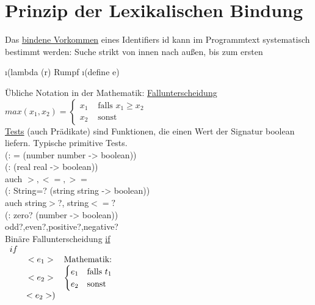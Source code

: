\section*{Prinzip der Lexikalischen Bindung}
Das \underline{bindene Vorkommen} eines Identifiers id kann im Programmtext systematisch bestimmt werden: Suche strikt von innen nach au\ss en, bis zum ersten
\begin{enumerate}[(1)]
\i (lambda (r) \auf Rumpf\zu
\i (define \auf e\zu)
\end{enumerate}
\"Ubliche Notation in der Mathematik: \underline{Fallunterscheidung}\\
$max(x_1,x_2) =
\begin{cases}
x_1 &\text{ falls } x_1 \geq x_2\\
x_2 &\text{ sonst } 
\end{cases}$\\
\underline{Tests} (auch Pr\"adikate) sind Funktionen, die einen Wert der Signatur boolean liefern. Typische primitive Tests.\\
(: = (number number -> boolean))\\
(: \auf (real real -> boolean))\\
auch $>,<=,>=$\\
(: String=? (string string -> boolean))\\
auch string$>$?, string$<=?$\\
(: zero? (number -> boolean))\\
odd?,even?,positive?,negative?\\
Bin\"are Fallunterscheidung \underline{if}\\
$\begin{array}{lcl}
if\\
& <e_1>& \text{Mathematik:}\\
& <e_2>& \begin{cases}e_1& \text{falls } t_1\\
					  e_2& \text{sonst}
\end{cases}\\
& <e_2>)
\end{array}$



